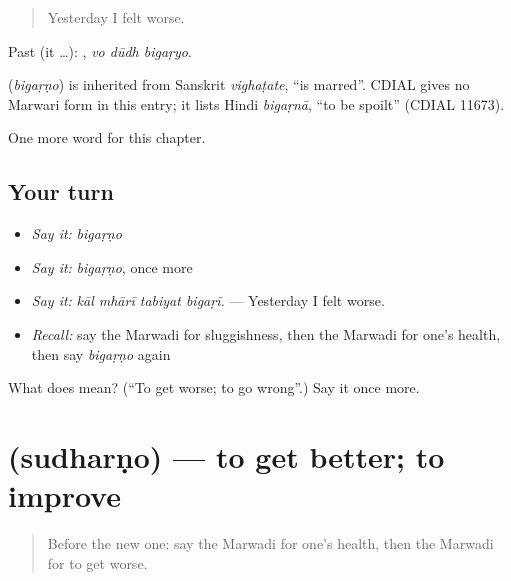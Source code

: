 \begin{quote}
Yesterday I felt worse.
\end{quote}

Past (it …):   , \emph{vo dūdh bigaṛyo}.

\begin{cousinweb}
\textbf{} (\emph{bigaṛṇo}) is inherited from Sanskrit \emph{vighaṭate}, \textquotedblleft{}is marred\textquotedblright{}. CDIAL gives no Marwari form in this entry; it lists Hindi \emph{bigaṛnā}, \textquotedblleft{}to be spoilt\textquotedblright{} (CDIAL 11673).
\end{cousinweb}

\begin{grammarlens}[title={What you've built}]
One more word for this chapter.
\end{grammarlens}

\subsection*{Your turn}
\begin{itemize}
\raggedright
  \item \emph{Say it:} \emph{bigaṛṇo}
  \item \emph{Say it:} \emph{bigaṛṇo}, once more
  \item \emph{Say it:} \emph{kāl mhārī tabiyat bigaṛī.} — Yesterday I felt worse.
  \item \emph{Recall:} say the Marwadi for sluggishness, then the Marwadi for one's health, then say \emph{bigaṛṇo} again
\end{itemize}

\begin{tcolorbox}[breakable,colback=teal!4,colframe=teal!35!black,title={Before you move on}]
What does  mean? (\textquotedblleft{}To get worse; to go wrong\textquotedblright{}.) Say it once more.
\end{tcolorbox}
\section[\texorpdfstring{\mw{सुधरणो} (sudharṇo)}{सुधरणो (sudharṇo)}]{ (sudharṇo) — to get better; to improve}

\label{lesson:MW-C255-sudharno-better}



\begin{quote}
Before the new one: say the Marwadi for one's health, then the Marwadi for to get worse.
\end{quote}

